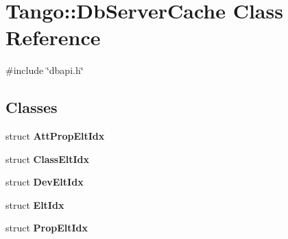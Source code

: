 \section{Tango\-:\-:Db\-Server\-Cache Class Reference}
\label{classTango_1_1DbServerCache}


{\ttfamily \#include \char`\"{}dbapi.\-h\char`\"{}}

\subsection*{Classes}
\begin{DoxyCompactItemize}
\item 
struct {\bf Att\-Prop\-Elt\-Idx}
\item 
struct {\bf Class\-Elt\-Idx}
\item 
struct {\bf Dev\-Elt\-Idx}
\item 
struct {\bf Elt\-Idx}
\item 
struct {\bf Prop\-Elt\-Idx}
\end{DoxyCompactItemize}
